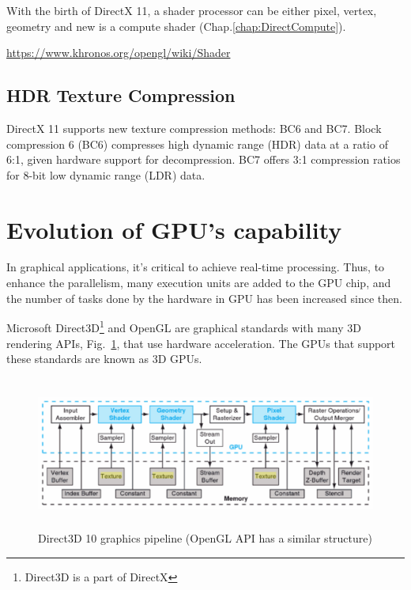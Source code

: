 With the birth of DirectX 11, a shader processor can be either pixel, vertex,
geometry and new is a compute shader (Chap.\ref{chap:DirectCompute}).


\url{https://www.khronos.org/opengl/wiki/Shader}



\subsection{HDR Texture Compression}
\label{sec:HDR_Texture_compression}

DirectX 11 supports new texture compression methods: BC6 and BC7. Block
compression 6 (BC6) compresses high dynamic range (HDR) data at a ratio of 6:1,
given hardware support for decompression. BC7 offers 3:1 compression ratios for
8-bit low dynamic range (LDR) data.  



\section{Evolution of GPU's capability}

In graphical applications, it's critical to achieve real-time
processing. Thus, to enhance the parallelism, many execution units are
added to the GPU chip, and the number of tasks done by the hardware in
GPU has been increased since then.  

Microsoft Direct3D\footnote{Direct3D is a part of DirectX} and OpenGL are
graphical standards with many 3D rendering APIs, Fig.~\ref{fig:direct3D}, that
use hardware acceleration. The GPUs that support these standards are known as 3D
GPUs.

\begin{figure}[hbt]
  \centerline{\includegraphics[height=5cm,
    angle=0]{./images/direct3D.eps}}
 \caption{Direct3D 10 graphics pipeline (OpenGL API has a similar structure)}
\label{fig:direct3D}
\end{figure}


